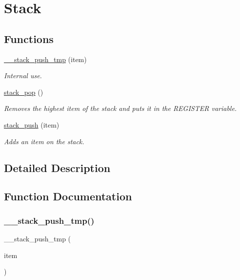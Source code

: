\hypertarget{group__stack}{}\section{Stack}
\label{group__stack}
\subsection*{Functions}
\begin{DoxyCompactItemize}
\item 
\hyperlink{group__stack_gadcb01cc6a3fd500b1e9a180ff299fa1f}{\+\_\+\+\_\+stack\+\_\+push\+\_\+tmp} (item)
\begin{DoxyCompactList}\small\item\em Internal use. \end{DoxyCompactList}\item 
\hyperlink{group__stack_gafcec48f7160b75a50d6a5ff973915768}{stack\+\_\+pop} ()
\begin{DoxyCompactList}\small\item\em Removes the highest item of the stack and puts it in the \textquotesingle{}R\+E\+G\+I\+S\+T\+ER\textquotesingle{} variable. \end{DoxyCompactList}\item 
\hyperlink{group__stack_ga6b8010e6e027472c4e17b4d8bdfbb9f2}{stack\+\_\+push} (item)
\begin{DoxyCompactList}\small\item\em Adds an item on the stack. \end{DoxyCompactList}\end{DoxyCompactItemize}


\subsection{Detailed Description}


\subsection{Function Documentation}
\mbox{\label{group__stack_gadcb01cc6a3fd500b1e9a180ff299fa1f}} 
\subsubsection{\texorpdfstring{\+\_\+\+\_\+stack\+\_\+push\+\_\+tmp()}{\_\_stack\_push\_tmp()}}
{\footnotesize\ttfamily \+\_\+\+\_\+stack\+\_\+push\+\_\+tmp (\begin{DoxyParamCaption}\item[{item}]{ }\end{DoxyParamCaption})}



